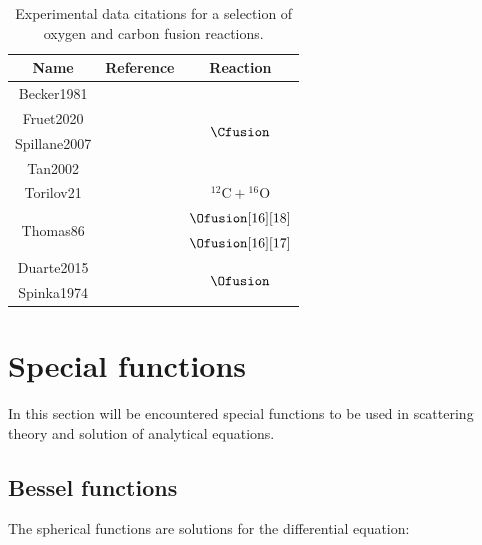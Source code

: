 \documentclass[openany]{book}
\begin{document}
 
\begin{table}[H]
	\centering
	\begin{tabular}{|c|c|c|}
		\hline
		Name & Reference & Reaction \\ \hline
		Becker1981 &   \cite{becker_kettner_rolfs_trautvetter_1981}  &    \multirow{4}{*}{$\Cfusion$} \\ \cline{1-2}
		Fruet2020 &  \cite{fruet_courtin_heine_jenkins_adsley_brown_canavan_catford_charon_curien_et_2020}          & \\ \cline{1-2}
		Spillane2007 &   \cite{spillane_raiola_rolfs_schurmann_strieder_zeng_becker_bordeanu_gialanella_romano_et_2007}  &   \\ \cline{1-2}
		Tan2002 &    \cite{tan_boeltzig_dulal_deboer_frentz_henderson_howard_kelmar_kolata_long_et_2020}  & \\ \hline
		Torilov21  &  \cite{torilov_maltsev_zherebchevsky_2021}     & $\mathrm{{}^{12}C + {}^{16}O}$       \\ \hline
		\multirow{2}{*}{Thomas86} & \multirow{2}{*}{  \cite{thomas_chen_hinds_meredith_olson_1986} }  &     $\Ofusion[16][18]$  \\ \cline{3-3} 
	 	 &  &     $\Ofusion[16][17]$ \\ \hline
		Duarte2015  &   \cite{duarte_gasques_oliveira_zagatto_chamon_medina_added_seale_alcantara-nunez_rossi_et_2015} & \multirow{2}{*}{ $\Ofusion$}  \\ \cline{1-2} 
		Spinka1974   &  \cite{spinka_winkler_1974}  &  \\ \hline
	\end{tabular}
	\caption[References oxygen and carbon fusion experimental data]{Experimental data citations for a selection of oxygen and carbon fusion reactions.}
\label{table:fusion}
\end{table}

\chapter{Special functions} \label{ap:specialFunctions}

In this section will be encountered special functions to be used in scattering theory and solution of analytical equations.

\section{Bessel functions} \label{sec:bessel}

The spherical functions are solutions for the differential equation:
\end{document}

